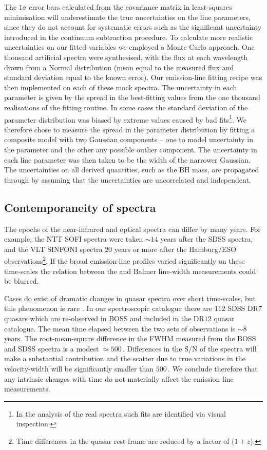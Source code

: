 The $1$$\sigma$ error bars calculated from the covariance matrix in least-squares minimisation will underestimate the true uncertainties on the line parameters, since they do not account for systematic errors such as the significant uncertainty introduced in the continuum subtraction procedure.  
To calculate more realistic uncertainties on our fitted variables we employed a Monte Carlo approach. 
One thousand artificial spectra were synthesised, with the flux at each wavelength drawn from a Normal distribution (mean equal to the measured flux and standard deviation equal to the known error).
Our emission-line fitting recipe was then implemented on each of these mock spectra. 
The uncertainty in each parameter is given by the spread in the best-fitting values from the one thousand realisations of the fitting routine. 
In some cases the standard deviation of the parameter distribution was biased by extreme values caused by bad fits\footnote{In the analysis of the real spectra such fits are identified via visual inspection.}. 
We therefore chose to measure the spread in the parameter distribution by fitting a composite model with two Gaussian components -- one to model uncertainty in the parameter and the other any possible outlier component. 
The uncertainty in each line parameter was then taken to be the width of the narrower Gaussian. 
The uncertainties on all derived quantities, such as the BH mass, are propagated through by assuming that the uncertainties are uncorrelated and independent. 

\subsection{Contemporaneity of spectra}

The epochs of the near-infrared and optical spectra can differ by many years.
For example, the NTT SOFI spectra were taken $\sim$$14$ years after the SDSS spectra, and the VLT SINFONI spectra $20$ years or more after the Hamburg/ESO observations\footnote{Time differences in the quasar rest-frame are reduced by a factor of ($1 + z$).}.
If the broad emission-line profiles varied significantly on these time-scales the relation between the  and Balmer line-width measurements could be blurred. 

Cases do exist of dramatic changes in quasar spectra over short time-scales, but this phenomenon is rare \citep{macleod16}. 
In our spectroscopic catalogue there are $112$ SDSS DR$7$ quasars which are re-observed in BOSS and included in the DR$12$ quasar catalogue. 
The mean time elapsed between the two sets of observations is $\sim8$ years. 
The root-mean-square difference in the  FWHM measured from the BOSS and SDSS spectra is a modest $\simeq500$\,\kms. 
Differences in the S/N of the spectra will make a substantial contribution and the scatter due to true variations in the  velocity-width will be significantly smaller than $500$\,\kms. 
We conclude therefore that any intrinsic changes with time do not materially affect the emission-line measurements.

